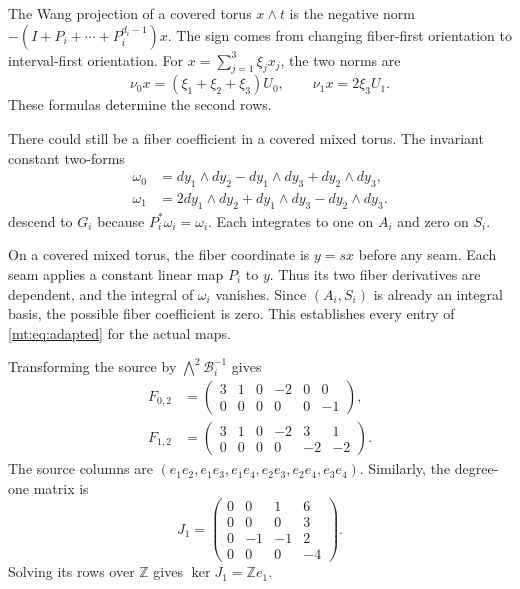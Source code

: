 The Wang projection of a covered torus $x\wedge t$ is the negative norm
$-(I+P_i+\cdots+P_i^{d_i-1})x$.
The sign comes from changing fiber-first orientation to interval-first orientation.
For $x=\sum_{j=1}^3\xi_jx_j$, the two norms are
\[
\nu_0x=(\xi_1+\xi_2+\xi_3)U_0,\qquad \nu_1x=2\xi_3U_1.
\]
These formulas determine the second rows.

There could still be a fiber coefficient in a covered mixed torus.
The invariant constant two-forms
\begin{equation}\label{mt:eq:forms}
\begin{aligned}
\omega_0&=dy_1\wedge dy_2-dy_1\wedge dy_3+dy_2\wedge dy_3,\\
\omega_1&=2dy_1\wedge dy_2+dy_1\wedge dy_3-dy_2\wedge dy_3.
\end{aligned}
\end{equation}
descend to $G_i$ because $P_i^*\omega_i=\omega_i$.
Each integrates to one on $A_i$ and zero on $S_i$.

On a covered mixed torus, the fiber coordinate is $y=sx$ before any seam.
Each seam applies a constant linear map $P_i$ to $y$.
Thus its two fiber derivatives are dependent, and the integral of $\omega_i$ vanishes.
Since $(A_i,S_i)$ is already an integral basis, the possible fiber coefficient is zero.
This establishes every entry of \eqref{mt:eq:adapted} for the actual maps.

Transforming the source by $\bigwedge^2\mathcal B_i^{-1}$ gives
\begin{equation}\label{mt:eq:Fi}
\begin{aligned}
F_{0,2}&=\begin{pmatrix}3&1&0&-2&0&0\\0&0&0&0&0&-1\end{pmatrix},\\
F_{1,2}&=\begin{pmatrix}3&1&0&-2&3&1\\0&0&0&0&-2&-2\end{pmatrix}.
\end{aligned}
\end{equation}
The source columns are $(e_1e_2,e_1e_3,e_1e_4,e_2e_3,e_2e_4,e_3e_4)$.
Similarly, the degree-one matrix is
\begin{equation}\label{mt:eq:J1}
J_1=\begin{pmatrix}0&0&1&6\\0&0&0&3\\0&-1&-1&2\\0&0&0&-4\end{pmatrix}.
\end{equation}
Solving its rows over $\mathbb Z$ gives $\ker J_1=\mathbb Ze_1$.

